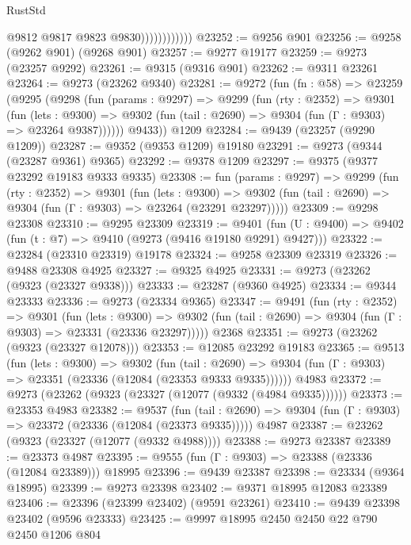 \begin{lexlean}{RustStd}
\begin{coremodule}
{\begin{coremodule}
{{{{{{{{{{{{{{{{{{{{{{{{{{{{{{{{{{{{{{{{{{{{{{{{{{{{{{{                            @9812
                            @9817
                            @9823
                            @9830))))))))))))
@23252 := @9256 @901
@23256 := @9258 (@9262 @901) (@9268 @901)
@23257 := @9277 @19177
@23259 := @9273 (@23257 @9292)
@23261 := @9315 (@9316 @901)
@23262 := @9311 @23261
@23264 := @9273 (@23262 @9340)
@23281 := @9272
    (fun (fn : @58) =>
    @23259
      (@9295
        (@9298
          (fun (params : @9297) =>
          @9299
            (fun (rty : @2352) =>
            @9301
              (fun (lets : @9300) =>
              @9302 (fun (tail : @2690) => @9304 (fun (Γ : @9303) => @23264 @9387))))))
        @9433))
    @1209
@23284 := @9439 (@23257 (@9290 @1209))
@23287 := @9352 (@9353 @1209) @19180
@23291 := @9273 (@9344 (@23287 @9361) @9365)
@23292 := @9378 @1209
@23297 := @9375 (@9377 @23292 @19183 @9333 @9335)
@23308 := fun (params : @9297) =>
  @9299
    (fun (rty : @2352) =>
    @9301
      (fun (lets : @9300) =>
      @9302 (fun (tail : @2690) => @9304 (fun (Γ : @9303) => @23264 (@23291 @23297)))))
@23309 := @9298 @23308
@23310 := @9295 @23309
@23319 := @9401
    (fun (U : @9400) => @9402 (fun (t : @7) => @9410 (@9273 (@9416 @19180 @9291) @9427)))
@23322 := @23284 (@23310 @23319) @19178
@23324 := @9258 @23309 @23319
@23326 := @9488 @23308 @4925
@23327 := @9325 @4925
@23331 := @9273 (@23262 (@9323 (@23327 @9338)))
@23333 := @23287 (@9360 @4925)
@23334 := @9344 @23333
@23336 := @9273 (@23334 @9365)
@23347 := @9491
    (fun (rty : @2352) =>
    @9301
      (fun (lets : @9300) =>
      @9302 (fun (tail : @2690) => @9304 (fun (Γ : @9303) => @23331 (@23336 @23297)))))
    @2368
@23351 := @9273 (@23262 (@9323 (@23327 @12078)))
@23353 := @12085 @23292 @19183
@23365 := @9513
    (fun (lets : @9300) =>
    @9302
      (fun (tail : @2690) =>
      @9304 (fun (Γ : @9303) => @23351 (@23336 (@12084 (@23353 @9333 @9335))))))
    @4983
@23372 := @9273 (@23262 (@9323 (@23327 (@12077 (@9332 (@4984 @9335))))))
@23373 := @23353 @4983
@23382 := @9537
    (fun (tail : @2690) => @9304 (fun (Γ : @9303) => @23372 (@23336 (@12084 (@23373 @9335)))))
    @4987
@23387 := @23262 (@9323 (@23327 (@12077 (@9332 @4988))))
@23388 := @9273 @23387
@23389 := @23373 @4987
@23395 := @9555 (fun (Γ : @9303) => @23388 (@23336 (@12084 @23389))) @18995
@23396 := @9439 @23387
@23398 := @23334 (@9364 @18995)
@23399 := @9273 @23398
@23402 := @9371 @18995 @12083 @23389
@23406 := @23396 (@23399 @23402) (@9591 @23261)
@23410 := @9439 @23398 @23402 (@9596 @23333)
@23425 := @9997
    @18995
    @2450
    @2450
    @22
    @790
    @2450
    @1206
    @804
}}}}}}}}}}}}}}}}}}}}}}}}}}}}}}}}}}}}}}}}}}}}}}}}}}}}}}}
\end{coremodule}}
\end{coremodule}
\end{lexlean}
